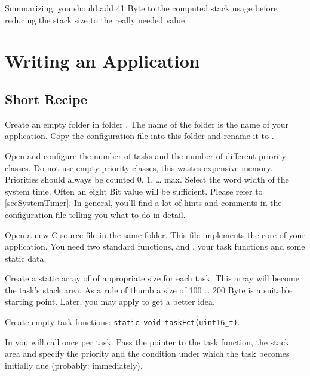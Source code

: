 Summarizing, you should add 41 Byte to the computed stack usage before
reducing the stack size to the really needed value.


%


\chapter{Writing an \rtos{} Application}
\label{secHowToWriteApp}

\section{Short Recipe}

Create an empty folder in folder .
The name of the folder is the name of your application. Copy the
configuration file  into this folder and rename
it to .

Open  and configure the number of tasks and the
number of different priority classes. Do not use empty priority classes,
this wastes expensive memory. Priorities should always be counted 0, 1,
\ldots{} max. Select the word width of the system time. Often an eight Bit
value will be sufficient. Please refer to \ref{secSystemTimer}. In
general, you'll find a lot of hints and comments in the configuration file
telling you what to do in detail.

Open a new C source file in the same folder. This file implements the core
of your application. You need two standard functions,  and
, your task functions and some static data.

Create a static array of  of appropriate size for each
task. This array will become the task's stack area. As a rule of thumb a
size of 100 \ldots{} 200 Byte is a suitable starting point. Later, you may apply
 to get a better idea.

Create empty task functions: \verb+static void taskFct(uint16_t)+.

In  you will call  once per task.
Pass the pointer to the task function, the stack area and specify the
priority and the condition under which the task becomes initially due
(probably: immediately).

